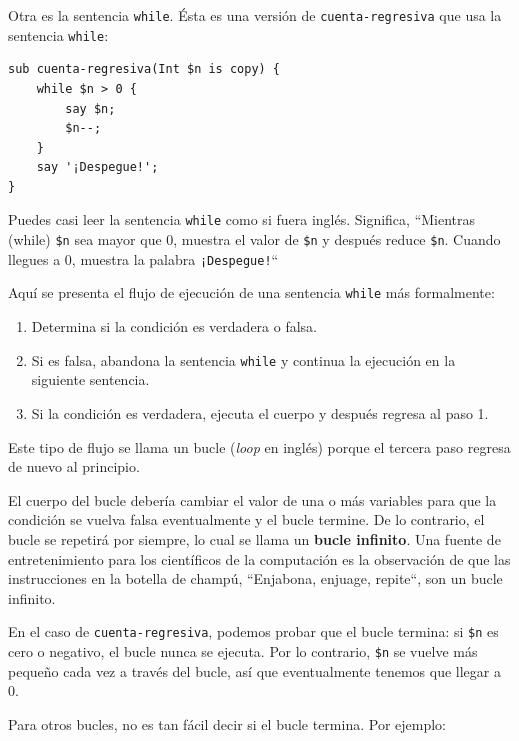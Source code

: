 Otra es la sentencia {\tt while}. Ésta es una versión de 
{\tt cuenta-regresiva} que usa la sentencia {\tt while}:

\begin{verbatim}
sub cuenta-regresiva(Int $n is copy) {
    while $n > 0 {
        say $n;
        $n--;
    }
    say '¡Despegue!';
}
\end{verbatim}
%
Puedes casi leer la sentencia {\tt while} como si fuera inglés.
Significa, ``Mientras (while) {\tt \$n} sea mayor que 0,
muestra el valor de {\tt \$n} y después reduce {\tt \$n}. Cuando 
llegues a 0, muestra la palabra {\tt ¡Despegue!}``

Aquí se presenta el flujo de ejecución de una sentencia {\tt while}
más formalmente:

\begin{enumerate}

\item Determina si la condición es verdadera o falsa.

\item Si es falsa, abandona la sentencia {\tt while}
y continua la ejecución en la siguiente sentencia.

\item Si la condición es verdadera, ejecuta el cuerpo y
después regresa al paso 1.

\end{enumerate}

Este tipo de flujo se llama un bucle (\emph{loop} en inglés)
porque el tercera paso regresa de nuevo al principio. 

El cuerpo del bucle debería cambiar el valor de una o más variables
para que la condición se vuelva falsa eventualmente y el bucle
termine. De lo contrario, el bucle se repetirá por siempre, lo cual 
se llama un {\bf bucle infinito}. Una fuente de entretenimiento para
los científicos de la computación es la observación de que las instrucciones
en la botella de champú, ``Enjabona, enjuage, repite``, son un bucle 
infinito.

En el caso de {\tt cuenta-regresiva}, podemos probar que el bucle
termina: si {\tt \$n} es cero o negativo, el bucle nunca se ejecuta.
Por lo contrario, {\tt \$n} se vuelve más pequeño cada vez a través del
bucle, así que eventualmente tenemos que llegar a 0.

Para otros bucles, no es tan fácil decir si el bucle termina. Por ejemplo:

